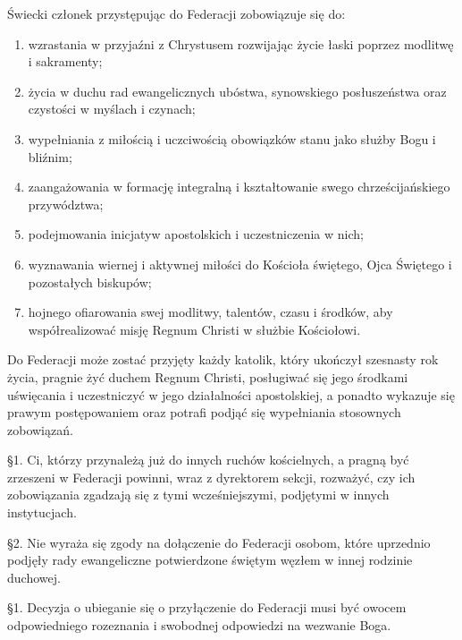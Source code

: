  Świecki członek przystępując do Federacji zobowiązuje się do:
\begin{enumerate}
	
	\item wzrastania w przyjaźni z Chrystusem rozwijając życie łaski poprzez modlitwę i sakramenty;
	
	\item życia w duchu rad ewangelicznych ubóstwa, synowskiego posłuszeństwa oraz czystości w myślach i czynach;
	
	\item wypełniania z miłością i uczciwością obowiązków stanu jako służby Bogu i bliźnim;
	
	\item zaangażowania w formację integralną i kształtowanie swego chrześcijańskiego przywództwa;
	
	\item podejmowania inicjatyw apostolskich i uczestniczenia w nich;
	
	\item wyznawania wiernej i aktywnej miłości do Kościoła świętego, Ojca Świętego i pozostałych biskupów;
	
	\item hojnego ofiarowania swej modlitwy, talentów, czasu i środków, aby współrealizować misję Regnum Christi w służbie Kościołowi.
\end{enumerate}


 Do Federacji może zostać przyjęty każdy katolik, który ukończył szesnasty rok życia, pragnie żyć duchem Regnum Christi, posługiwać się jego środkami uświęcania i uczestniczyć w jego działalności apostolskiej, a ponadto wykazuje się prawym postępowaniem oraz potrafi podjąć się wypełniania stosownych zobowiązań.


 \S{}1. Ci, którzy przynależą już do innych ruchów kościelnych, a pragną być zrzeszeni w Federacji powinni, wraz z dyrektorem sekcji, rozważyć, czy ich zobowiązania zgadzają się z tymi wcześniejszymi, podjętymi w innych instytucjach.

\S{}2. Nie wyraża się zgody na dołączenie do Federacji osobom, które uprzednio podjęły rady ewangeliczne potwierdzone świętym węzłem w innej rodzinie duchowej.


 \S{}1. Decyzja o ubieganie się o przyłączenie do Federacji musi być owocem odpowiedniego rozeznania i swobodnej odpowiedzi na wezwanie Boga.


